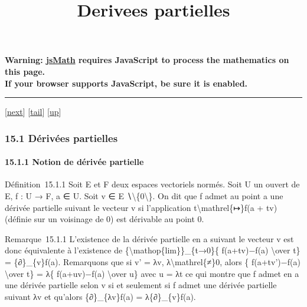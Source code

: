\documentclass[]{article}
\title{Derivees partielles}
\author{}
\date{}
\begin{document}
\maketitle

\textbf{Warning: \href{http://www.math.union.edu/locate/jsMath}{jsMath}
requires JavaScript to process the mathematics on this page.\\ If your
browser supports JavaScript, be sure it is enabled.}

\begin{center}\rule{3in}{0.4pt}\end{center}

{[}\href{coursse83.html}{next}{]}
{[}\hyperref[tailcoursse82.html]{tail}{]}
{[}\href{coursch16.html\#coursse82.html}{up}{]}

\subsubsection{15.1 Dérivées partielles}

\paragraph{15.1.1 Notion de dérivée partielle}

Définition~15.1.1 Soit E et F deux espaces vectoriels normés. Soit U un
ouvert de E, f : U → F, a ∈ U. Soit v ∈ E
∖\textbackslash{}\{0\textbackslash{}\}. On dit que f admet au point a
une dérivée partielle suivant le vecteur v si l'application
t\textbackslash{}mathrel\{↦\}f(a + tv) (définie sur un voisinage de 0)
est dérivable au point 0.

Remarque~15.1.1 L'existence de la dérivée partielle en a suivant le
vecteur v est donc équivalente à l'existence de
\{\textbackslash{}mathop\{lim\}\}\_\{t→0\}\{ f(a+tv)−f(a)
\textbackslash{}over t\} = \{∂\}\_\{v\}f(a). Remarquons que si v' = λv,
λ\textbackslash{}mathrel\{≠\}0, alors \{ f(a+tv')−f(a)
\textbackslash{}over t\} = λ\{ f(a+uv)−f(a) \textbackslash{}over u\}
avec u = λt ce qui montre que f admet en a une dérivée partielle selon v
si et seulement si f admet une dérivée partielle suivant λv et qu'alors
\{∂\}\_\{λv\}f(a) = λ\{∂\}\_\{v\}f(a).
\end{document}
